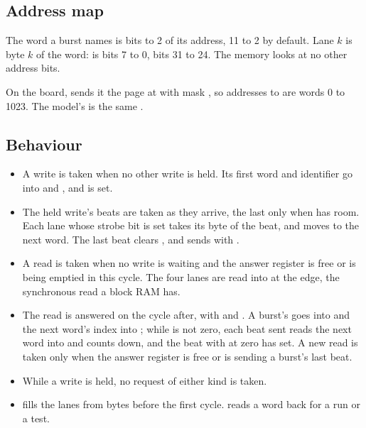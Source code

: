 \subsection*{Address map}

The word a burst names is bits  to 2 of its address,
11 to 2 by default. Lane $k$ is
byte $k$ of the word:  is bits 7 to 0,  bits 31
to 24. The memory looks at no other address bits.

On the board,  sends it the page at 
with mask , so addresses  to
 are words 0 to 1023. The model's  is
the same .


\subsection*{Behaviour}

\begin{itemize}
\item A write is taken when no other write is held. Its first word
and identifier go into  and , and 
is set.
\item The held write's beats are taken as they arrive, the last only
when  has room. Each lane whose strobe bit is set takes
its byte of the beat, and  moves to the next word. The
last beat clears , and  sends 
with .
\item A read is taken when no write is waiting and the answer register
is free or is being emptied in this cycle. The four lanes are read
into  at the edge, the synchronous read a block RAM has.
\item The read is answered on  the cycle after, with
 and . A burst's  goes into
 and the next word's index into ; while
 is not zero, each beat sent reads the next word into
 and counts  down, and the beat with
 at zero has  set. A new read is taken only
when the answer register is free or is sending a burst's last beat.
\item While a write is held, no request of either kind is taken.
\item {} fills the lanes from bytes before the first
cycle.  reads a word back for a run or a test.
\end{itemize}

